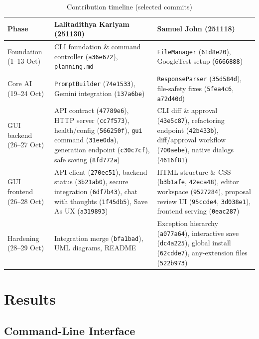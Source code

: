 \documentclass[12pt,a4paper,oneside]{book}
\begin{document}
\begin{table}[htbp]
\centering\small
\begin{tabular}{|p{2.6cm}|p{5.5cm}|p{5.5cm}|}
\hline
\textbf{Phase} & \textbf{Lalitadithya Kariyam (251130)} & \textbf{Samuel John (251118)} \\ \hline
Foundation (1--13 Oct) & CLI foundation \& command controller (\texttt{a36e672}), \texttt{planning.md} & \texttt{FileManager} (\texttt{61d8e20}), GoogleTest setup (\texttt{6666888}) \\ \hline
Core AI (19--24 Oct) & \texttt{PromptBuilder} (\texttt{74e1533}), Gemini integration (\texttt{137a6be}) & \texttt{ResponseParser} (\texttt{35d584d}), file-safety fixes (\texttt{5fea4c6}, \texttt{a72d40d}) \\ \hline
GUI backend (26--27 Oct) & API contract (\texttt{47789e6}), HTTP server (\texttt{cc7f573}), health/config (\texttt{566250f}), \texttt{gui} command (\texttt{31ee0da}), generation endpoint (\texttt{c30c7cf}), safe saving (\texttt{8fd772a}) & CLI diff \& approval (\texttt{43e5c87}), refactoring endpoint (\texttt{42b433b}), diff/approval workflow (\texttt{700aebe}), native dialogs (\texttt{4616f81}) \\ \hline
GUI frontend (26--28 Oct) & API client (\texttt{270ec51}), backend status (\texttt{3b21ab0}), secure integration (\texttt{6df7b43}), chat with thoughts (\texttt{1f45db5}), Save As UX (\texttt{a319893}) & HTML structure \& CSS (\texttt{b3b1afe}, \texttt{42eca48}), editor workspace (\texttt{9527284}), proposal review UI (\texttt{95ccde4}, \texttt{3d038e1}), frontend serving (\texttt{0eac287}) \\ \hline
Hardening (28--29 Oct) & Integration merge (\texttt{bfa1bad}), UML diagrams, README & Exception hierarchy (\texttt{a077a64}), interactive save (\texttt{dc4a225}), global install (\texttt{62cdde7}), any-extension files (\texttt{522b973}) \\ \hline
\end{tabular}
\caption{Contribution timeline (selected commits)}
\label{tab:ca-contrib}
\end{table}

\clearpage
\section{Results}
\label{sec:ca-results}

\subsection{Command-Line Interface}
\end{document}
